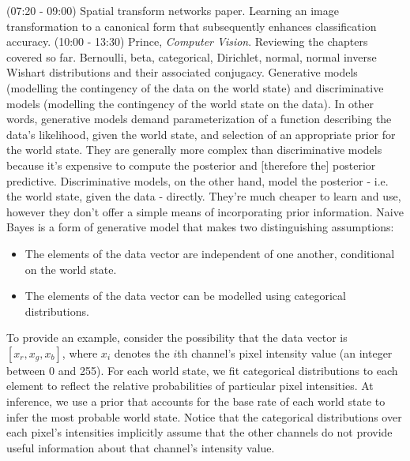 \documentclass[idxtotoc,hyperref,openany]{labbook} %
\begin{document}
(07:20 - 09:00) Spatial transform networks paper. Learning an image transformation to a canonical form that subsequently enhances classification accuracy.
(10:00 - 13:30) Prince, \emph{Computer Vision}. Reviewing the chapters covered so far. Bernoulli, beta, categorical, Dirichlet, normal, normal inverse Wishart distributions and their associated conjugacy. Generative models (modelling the contingency of the data on the world state) and discriminative models (modelling the contingency of the world state on the data). In other words, generative models demand parameterization of a function describing the data's likelihood, given the world state, and selection of an appropriate prior for the world state. They are generally more complex than discriminative models because it's expensive to compute the posterior and [therefore the] posterior predictive. Discriminative models, on the other hand, model the posterior - i.e. the world state, given the data - directly. They're much cheaper to learn and use, however they don't offer a simple means of incorporating prior information. Naive Bayes is a form of generative model that makes two distinguishing assumptions:
\begin{itemize}
	\item The elements of the data vector are independent of one another, conditional on the world state.
	\item The elements of the data vector can be modelled using categorical distributions.
\end{itemize}
To provide an example, consider the possibility that the data vector is $[x_r, x_g, x_b]$, where $x_i$ denotes the $i$th channel's pixel intensity value (an integer between 0 and 255). For each world state, we fit categorical distributions to each element to reflect the relative probabilities of particular pixel intensities. At inference, we use a prior that accounts for the base rate of each world state to infer the most probable world state. Notice that the categorical distributions over each pixel's intensities implicitly assume that the other channels do not provide useful information about that channel's intensity value.
\end{document}
